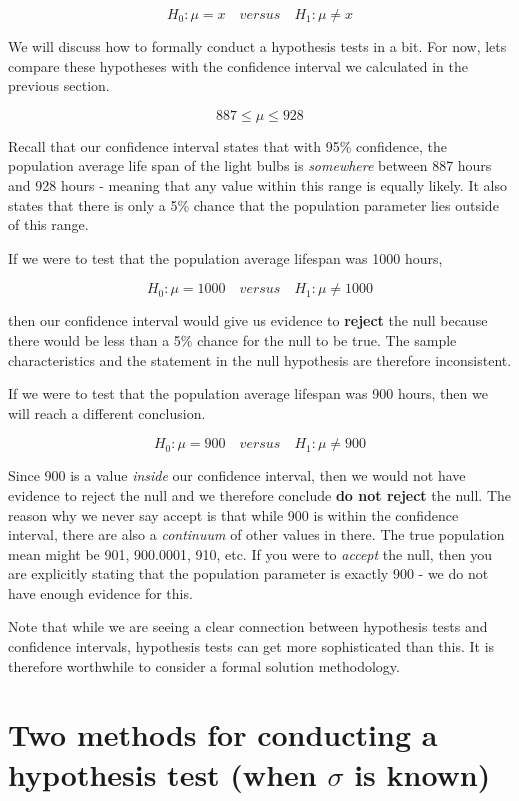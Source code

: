 \documentclass[
]{book}
\begin{document}
\[H_0:\mu=x \quad versus \quad H_1:\mu\neq x\]

We will discuss how to formally conduct a hypothesis tests in a bit. For now, lets compare these hypotheses with the confidence interval we calculated in the previous section.

\[887 \leq \mu \leq 928\]

Recall that our confidence interval states that with 95\% confidence, the population average life span of the light bulbs is \emph{somewhere} between 887 hours and 928 hours - meaning that any value within this range is equally likely. It also states that there is only a 5\% chance that the population parameter lies outside of this range.

If we were to test that the population average lifespan was 1000 hours,

\[H_0:\mu=1000 \quad versus \quad H_1:\mu\neq 1000\]

then our confidence interval would give us evidence to \textbf{reject} the null because there would be less than a 5\% chance for the null to be true. The sample characteristics and the statement in the null hypothesis are therefore inconsistent.

If we were to test that the population average lifespan was 900 hours, then we will reach a different conclusion.

\[H_0:\mu=900 \quad versus \quad H_1:\mu\neq 900\]

Since 900 is a value \emph{inside} our confidence interval, then we would not have evidence to reject the null and we therefore conclude \textbf{do not reject} the null. The reason why we never say accept is that while 900 is within the confidence interval, there are also a \emph{continuum} of other values in there. The true population mean might be 901, 900.0001, 910, etc. If you were to \emph{accept} the null, then you are explicitly stating that the population parameter is exactly 900 - we do not have enough evidence for this.

Note that while we are seeing a clear connection between hypothesis tests and confidence intervals, hypothesis tests can get more sophisticated than this. It is therefore worthwhile to consider a formal solution methodology.

\hypertarget{two-methods-for-conducting-a-hypothesis-test-when-sigma-is-known}{%
\section{\texorpdfstring{Two methods for conducting a hypothesis test (when \(\sigma\) is known)}{Two methods for conducting a hypothesis test (when \textbackslash sigma is known)}}\label{two-methods-for-conducting-a-hypothesis-test-when-sigma-is-known}}
\end{document}
